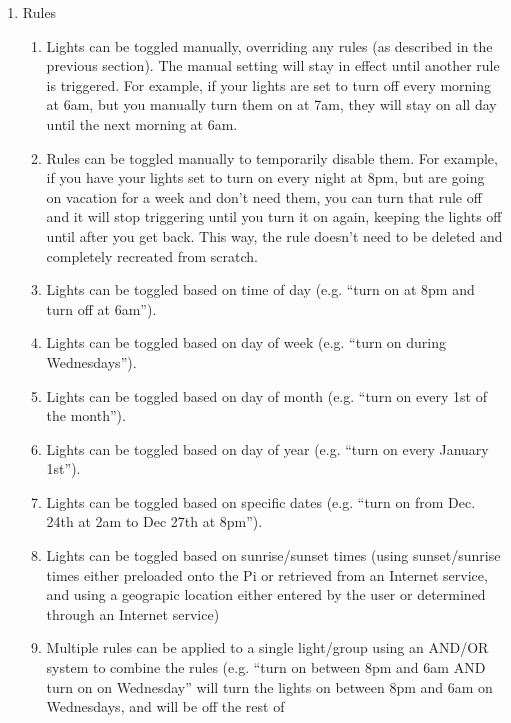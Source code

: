 \begin{enumerate}
    \item Rules
        \begin{enumerate}
            \item Lights can be toggled manually, overriding any rules (as
                described in the previous section). The manual setting will
                stay in effect until another rule is triggered. For example, if
                your lights are set to turn off every morning at 6am, but you
                manually turn them on at 7am, they will stay on all day until
                the next morning at 6am.
            \item Rules can be toggled manually to temporarily disable them.
                For example, if you have your lights set to turn on every night
                at 8pm, but are going on vacation for a week and don't need
                them, you can turn that rule off and it will stop triggering
                until you turn it on again, keeping the lights off until after
                you get back. This way, the rule doesn't need to be deleted and
                completely recreated from scratch.
            \item Lights can be toggled based on time of day (e.g. ``turn on at
                8pm and turn off at 6am'').
            \item Lights can be toggled based on day of week (e.g. ``turn on
                during Wednesdays'').
            \item Lights can be toggled based on day of month (e.g. ``turn on
                every 1st of the month'').
            \item Lights can be toggled based on day of year (e.g. ``turn on
                every January 1st'').
            \item Lights can be toggled based on specific dates (e.g. ``turn on
                from Dec. 24th at 2am to Dec 27th at 8pm'').
            \item Lights can be toggled based on sunrise/sunset times (using
                sunset/sunrise times either preloaded onto the Pi or retrieved
                from an Internet service, and using a geograpic location either
                entered by the user or determined through an Internet service)
            \item Multiple rules can be applied to a single light/group using
                an AND/OR system to combine the rules (e.g. ``turn on between
                8pm and 6am AND turn on on Wednesday'' will turn the lights on
                between 8pm and 6am on Wednesdays, and will be off the rest of

\end{enumerate}
\end{enumerate}
